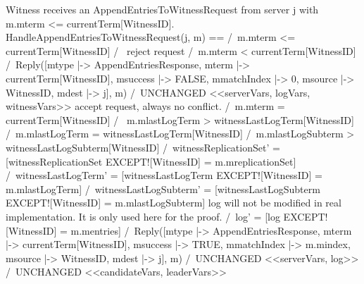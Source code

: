 \documentclass{standalone}
\begin{document}
\onehalfspacing

    \begin{tla}

\* Witness receives an AppendEntriesToWitnessRequest from server j with
\* m.mterm <= currentTerm[WitnessID]. 
HandleAppendEntriesToWitnessRequest(j, m) ==
    /\ m.mterm <= currentTerm[WitnessID]
    /\ \/ \* reject request
          /\ m.mterm < currentTerm[WitnessID]
          /\ Reply([mtype           |-> AppendEntriesResponse,
                    mterm           |-> currentTerm[WitnessID],
                    msuccess        |-> FALSE,
                    mmatchIndex     |-> 0,
                    msource         |-> WitnessID,
                    mdest           |-> j],
                    m)
          /\ UNCHANGED <<serverVars, logVars, witnessVars>>
       \/ \* accept request, always no conflict.
          /\ m.mterm = currentTerm[WitnessID]
          /\ \/ m.mlastLogTerm > witnessLastLogTerm[WitnessID]
             \/ /\ m.mlastLogTerm = witnessLastLogTerm[WitnessID]
                /\ m.mlastLogSubterm > witnessLastLogSubterm[WitnessID]
          /\ witnessReplicationSet' = 
              [witnessReplicationSet EXCEPT![WitnessID] = m.mreplicationSet]
          /\ witnessLastLogTerm' =
              [witnessLastLogTerm EXCEPT![WitnessID] = m.mlastLogTerm]
          /\ witnessLastLogSubterm' =
              [witnessLastLogSubterm EXCEPT![WitnessID] = m.mlastLogSubterm]
          \* log will not be modified in real implementation. It is only
          \* used here for the proof.
          /\ log' = [log EXCEPT![WitnessID] = m.mentries]
          /\ Reply([mtype           |-> AppendEntriesResponse,
                    mterm           |-> currentTerm[WitnessID],
                    msuccess        |-> TRUE,
                    mmatchIndex     |-> m.mindex,
                    msource         |-> WitnessID,
                    mdest           |-> j],
                    m)
          /\ UNCHANGED <<serverVars, log>>
    /\ UNCHANGED <<candidateVars, leaderVars>>
    \end{tla}
\end{document}
